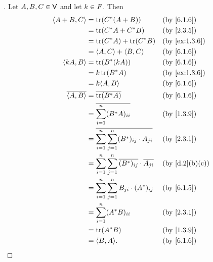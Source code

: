 \begin{proof}[]
  Let \(A, B, C \in \mathsf{V}\) and let \(k \in \mathit{F}\).
  Then
  \begin{align*}
    \inn{A + B, C}    & = \tr(C^* (A + B))                                                      &  & \text{(by \cref{6.1.6})}     \\
                      & = \tr(C^* A + C^* B)                                                    &  & \text{(by \cref{2.3.5})}     \\
                      & = \tr(C^* A) + \tr(C^* B)                                               &  & \text{(by \cref{ex:1.3.6})}  \\
                      & = \inn{A, C} + \inn{B, C}                                               &  & \text{(by \cref{6.1.6})}     \\
    \inn{kA, B}       & = \tr(B^* (kA))                                                         &  & \text{(by \cref{6.1.6})}     \\
                      & = k \tr(B^* A)                                                          &  & \text{(by \cref{ex:1.3.6})}  \\
                      & = k \inn{A, B}                                                          &  & \text{(by \cref{6.1.6})}     \\
    \conj{\inn{A, B}} & = \conj{\tr(B^* A)}                                                     &  & \text{(by \cref{6.1.6})}     \\
                      & = \conj{\sum_{i = 1}^n (B^* A)_{i i}}                                   &  & \text{(by \cref{1.3.9})}     \\
                      & = \conj{\sum_{i = 1}^n \sum_{j = 1}^n (B^*)_{i j} \cdot A_{j i}}        &  & \text{(by \cref{2.3.1})}     \\
                      & = \sum_{i = 1}^n \sum_{j = 1}^n \conj{(B^*)_{i j}} \cdot \conj{A_{j i}} &  & \text{(by \cref{d.2}(b)(c))} \\
                      & = \sum_{i = 1}^n \sum_{j = 1}^n B_{j i} \cdot (A^*)_{i j}               &  & \text{(by \cref{6.1.5})}     \\
                      & = \sum_{i = 1}^n (A^* B)_{i i}                                          &  & \text{(by \cref{2.3.1})}     \\
                      & = \tr(A^* B)                                                            &  & \text{(by \cref{1.3.9})}     \\
                      & = \inn{B, A}.                                                           &  & \text{(by \cref{6.1.6})}

\end{align*}
\end{proof}
